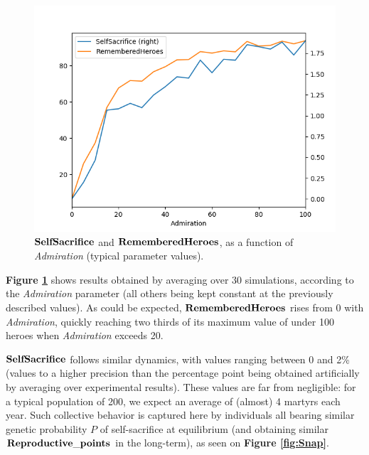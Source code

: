 \documentclass[a4paper,12pt]{report}
\begin{document}
\begin{figure}[h]
\centering
\includegraphics[width=1\textwidth]{RGT_10}
\caption{$\bf{SelfSacrifice}$ and $\bf{RememberedHeroes}$, as a function of \emph{Admiration} (typical parameter values).}
\label{fig:RGT_10}
\end{figure}



\textbf{Figure \ref{fig:RGT_10}} shows results obtained by averaging over 30 simulations, according to the \emph{Admiration}
 parameter (all others being kept constant at the previously described values). As could be expected, $\bf{RememberedHeroes}$
 rises from 0 with \emph{Admiration}, quickly reaching two thirds of its maximum value of under 100 heroes when
 \emph{Admiration} exceeds 20. 
 
 $\bf{SelfSacrifice}$ follows similar dynamics, with values ranging between 0 and 2\% (values to a higher precision than
 the percentage point being obtained artificially by averaging over experimental results). These values are far from negligible:
 for a typical population of 200, we expect an average of (almost) 4 martyrs each year.
 Such collective behavior is captured here by individuals all bearing similar genetic probability $P$
 of self-sacrifice at equilibrium (and obtaining similar $\bf{Reproductive\_points}$ in the 
 long-term), as seen on \textbf{Figure \ref{fig:Snap}}. 
 
\end{document}
